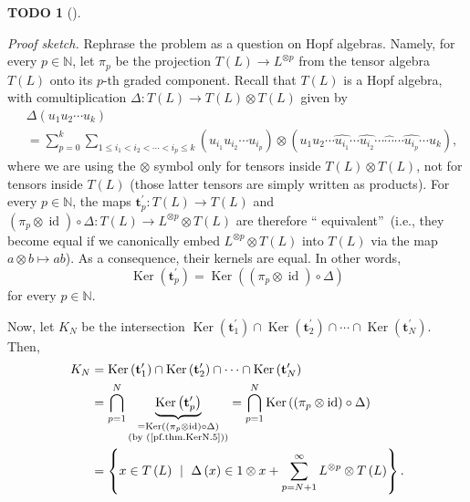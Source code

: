 \documentclass[numbers=enddot,12pt,final,onecolumn,notitlepage]{scrartcl}%
\theoremstyle{definition}
\newtheorem{quest}[theo]{TODO}
\newenvironment{todo}[1][]
{\begin{quest}[#1]\begin{leftbar}}
{\end{leftbar}\end{quest}}
\let\sumnonlimits\sum
\renewcommand{\sum}{\sumnonlimits\limits}
\begin{document}
\begin{todo}
\textit{Proof sketch.} Rephrase the problem as a question on Hopf algebras.
Namely, for every $p\in\mathbb{N}$, let $\pi_{p}$ be the projection $T\left(
L\right)  \rightarrow L^{\otimes p}$ from the tensor algebra $T\left(
L\right)  $ onto its $p$-th graded component. Recall that $T\left(  L\right)
$ is a Hopf algebra, with comultiplication $\Delta:T\left(  L\right)
\rightarrow T\left(  L\right)  \otimes T\left(  L\right)  $ given by%
\begin{align*}
&  \Delta\left(  u_{1}u_{2}\cdots u_{k}\right) \\
&  =\sum_{p=0}^{k}\sum_{1\leq i_{1}<i_{2}<\cdots<i_{p}\leq k}\left(  u_{i_{1}%
}u_{i_{2}}\cdots u_{i_{p}}\right)  \otimes\left(  u_{1}u_{2}\cdots
\widehat{u_{i_{1}}}\cdots\widehat{u_{i_{2}}}\cdots\widehat{\cdots}%
\cdots\widehat{u_{i_{p}}}\cdots u_{k}\right)  ,
\end{align*}
where we are using the $\otimes$ symbol only for tensors inside $T\left(
L\right)  \otimes T\left(  L\right)  $, not for tensors inside $T\left(
L\right)  $ (those latter tensors are simply written as products). For every
$p\in\mathbb{N}$, the maps $\mathbf{t}_{p}^{\prime}:T\left(  L\right)
\rightarrow T\left(  L\right)  $ and $\left(  \pi_{p}\otimes\operatorname*{id}%
\right)  \circ\Delta:T\left(  L\right)  \rightarrow L^{\otimes p}\otimes
T\left(  L\right)  $ are therefore \textquotedblleft
equivalent\textquotedblright\ (i.e., they become equal if we canonically embed
$L^{\otimes p}\otimes T\left(  L\right)  $ into $T\left(  L\right)  $ via the
map $a\otimes b\mapsto ab$). As a consequence, their kernels are equal. In
other words,%
\begin{equation}
\operatorname*{Ker}\left(  \mathbf{t}_{p}^{\prime}\right)
=\operatorname*{Ker}\left(  \left(  \pi_{p}\otimes\operatorname*{id}\right)
\circ\Delta\right)  \label{pf.thm.KerN.5}%
\end{equation}
for every $p\in\mathbb{N}$.

Now, let $K_{N}$ be the intersection $\operatorname*{Ker}\left(
\mathbf{t}_{1}^{\prime}\right)  \cap\operatorname*{Ker}\left(  \mathbf{t}%
_{2}^{\prime}\right)  \cap\cdots\cap\operatorname*{Ker}\left(  \mathbf{t}%
_{N}^{\prime}\right)  $. Then,%
\begin{align}
K_{N}  &  =\operatorname*{Ker}\left(  \mathbf{t}_{1}^{\prime}\right)
\cap\operatorname*{Ker}\left(  \mathbf{t}_{2}^{\prime}\right)  \cap\cdots
\cap\operatorname*{Ker}\left(  \mathbf{t}_{N}^{\prime}\right) \nonumber\\
&  =\bigcap_{p=1}^{N}\underbrace{\operatorname*{Ker}\left(  \mathbf{t}%
_{p}^{\prime}\right)  }_{\substack{=\operatorname*{Ker}\left(  \left(  \pi
_{p}\otimes\operatorname*{id}\right)  \circ\Delta\right)  \\\text{(by
(\ref{pf.thm.KerN.5}))}}}=\bigcap_{p=1}^{N}\operatorname*{Ker}\left(  \left(
\pi_{p}\otimes\operatorname*{id}\right)  \circ\Delta\right) \nonumber\\
&  =\left\{  x\in T\left(  L\right)  \ \mid\ \Delta\left(  x\right)
\in1\otimes x+\sum_{p=N+1}^{\infty}L^{\otimes p}\otimes T\left(  L\right)
\right\}  . \label{pf.thm.KerN.7}%
\end{align}



\end{todo}
\end{document}
